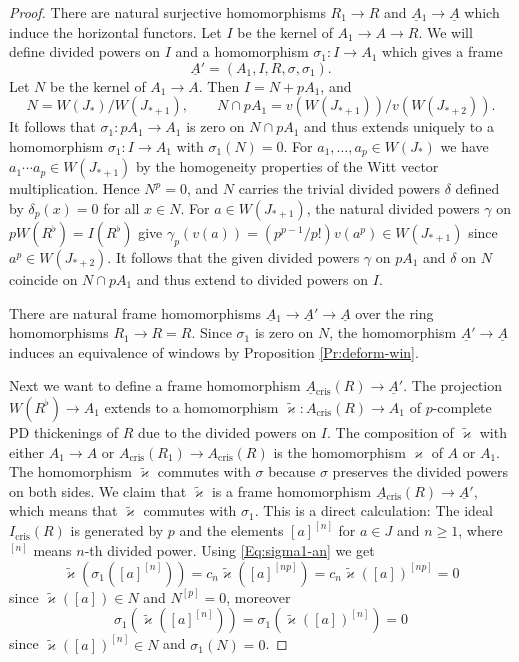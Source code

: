 \documentclass[a4paper,11pt]{article}
\theoremstyle{plain}
\theoremstyle{definition}
\theoremstyle{remark}
\theoremstyle{definition}
\numberwithin{Lemma}{section}
\numberwithin{Subpoint}{Lemma}
\numberwithin{equation}{section}
\DeclareMathOperator{\cris}{cris}
\renewcommand{\u}{\underline}
\newcommand{\chang}[1]{{#1}}
\begin{document}
\begin{proof}
There are natural surjective homomorphisms $R_1\to R$
and $\u A{}_1\to\u A$ which induce the horizontal functors.
Let $I$ be the kernel of $A_1\to A\to R$.
We will define divided powers on $I$ and
a homomorphism $\sigma_1:I\to A_1$ which gives a frame
\[
\u A'=(A_1,I,R,\sigma,\sigma_1).
\]
Let $N$ be the kernel of $A_1\to A$.
Then $I=N+pA_1$, and
\[
N=W(J_*)/W(J_{*+1}),
\qquad
N\cap pA_1=v(W(J_{*+1}))/v(W(J_{*+2})).
\]
It follows that $\sigma_1:pA_1\to A_1$ is zero on $N\cap pA_1$
and thus extends uniquely to a homomorphism
$\sigma_1:I\to A_1$ with $\sigma_1(N)=0$.
For $a_1,\ldots,a_p\in W(J_*)$ we have $a_1\cdots a_p\in W(J_{*+1})$ 
by the homogeneity properties of the Witt vector multiplication. 
Hence $N^p=0$, 
and $N$ carries the trivial divided powers $\delta$ defined by
$\delta_p(x)=0$ for all $x\in N$.
For $a\in W(J_{*+1})$, the natural divided powers $\gamma$
on $pW(R^\flat)=I(R^\flat)$ give
$\gamma_p(v(a))=(p^{p-1}/p!)v(a^p)\in W(J_{*+1})$ 
since $a^p\in W(J_{*+2})$. 
It follows that the given divided powers $\gamma$ on $pA_1$
and $\delta$ on $N$ coincide on $N\cap pA_1$ and thus extend 
to divided powers on $I$.

There are natural frame homomorphisms $\u A{}_1\to\u A'\to \u A$ 
over the ring homomorphisms $R_1\to R=R$.
Since $\sigma_1$ is zero on $N$,
the homomorphism $\u A'\to\u A$ induces an equivalence of windows
by Proposition \ref{Pr:deform-win}.

Next we want to define a frame homomorphism $\u A{}_{\cris}(R)\to\u A'$.
The projection $W(R^\flat)\to A_1$ extends to a homomorphism 
$\tilde\varkappa:A_{\cris}(R)\to A_1$ 
of \chang{$p$-complete} PD thickenings of $R$
due to the divided powers on $I$.
The composition of $\tilde\varkappa$ with either
$A_1\to A$ or $A_{\cris}(R_1)\to A_{\cris}(R)$
is the homomorphism $\varkappa$ of $A$ or $A_1$.
The homomorphism $\tilde\varkappa$ commutes with $\sigma$
because $\sigma$ preserves the divided powers on both sides.
We claim that $\tilde\varkappa$ is a frame homomorphism
$\u A{}_{\cris}(R)\to\u A'$, which means that $\tilde\varkappa$
commutes with $\sigma_1$. This is a direct calculation:
The ideal $I_{\cris}(R)$ is generated
by $p$ and the elements $[a]^{[n]}$ for $a\in J$ and $n\ge 1$,
where $^{[n]}$ means $n$-th divided power.
Using \eqref{Eq:sigma1-an} we get
\[
\tilde\varkappa(\sigma_1([a]^{[n]}))
=c_n\tilde\varkappa([a]^{[np]})
=c_n\tilde\varkappa([a])^{[np]}
=0
\]
since $\tilde\varkappa([a])\in N$ and $N^{[p]}=0$, 
moreover
\[
\sigma_1(\tilde\varkappa([a]^{[n]}))
=\sigma_1(\tilde\varkappa([a])^{[n]})=0
\]
since $\tilde\varkappa([a])^{[n]}\in N$ and $\sigma_1(N)=0$.


\end{proof}
\end{document}
